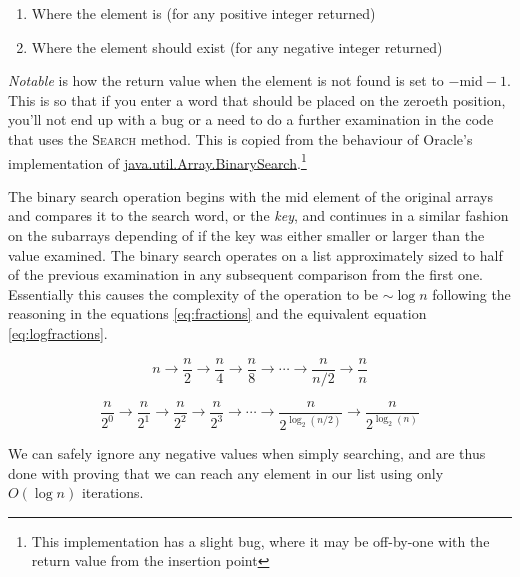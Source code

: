 \documentclass[a4paper,11pt,notitlepage]{article}
\begin{document}
\begin{enumerate}
\item Where the element is (for any positive integer returned)
\item Where the element should exist (for any negative integer returned)
\end{enumerate}

\textit{Notable} is how the return value when the element is not found is set to $-\text{mid}-1$. This is so that if you enter a word that should be placed on the zeroeth position, you'll not end up with a bug or a need to do a further examination in the code that uses the \textsc{Search} method. This is copied from the behaviour of Oracle's implementation of \href{http://docs.oracle.com/javase/7/docs/api/java/util/Arrays.html}{java.util.Array.BinarySearch}.\footnote{This implementation has a slight bug, where it may be off-by-one with the return value from the insertion point}

The binary search operation begins with the mid element of the original arrays and compares it to the search word, or the \textit{key}, and continues in a similar fashion on the subarrays depending of if the key was either smaller or larger than the value examined. The binary search operates on a list approximately sized to half of the previous examination in any subsequent comparison from the first one. Essentially this causes the complexity of the operation to be $\sim \log n$ following the reasoning in the equations \ref{eq:fractions} and the equivalent equation \ref{eq:logfractions}.

\begin{equation}\label{eq:fractions}
n \to \frac{n}{2} \to \frac{n}{4} \to \frac{n}{8} \to \cdots \to \frac{n}{n/2} \to \frac{n}{n}
\end{equation}

\begin{equation}\label{eq:logfractions}
\frac{n}{2^0} \to \frac{n}{2^1} \to \frac{n}{2^2} \to \frac{n}{2^3} \to \cdots \to \frac{n}{2^{\log_2({n/2})}} \to \frac{n}{2^{\log_2({n})}}
\end{equation}

We can safely ignore any negative values when simply searching, and are thus done with proving that we can reach any element in our list using only $O(\log n)$ iterations.


\end{document}
